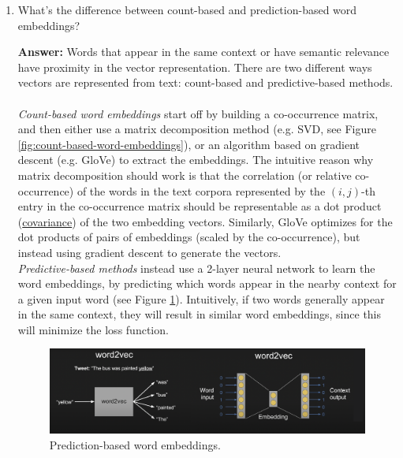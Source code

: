 \documentclass{article}
\newenvironment{QandA}{\begin{enumerate}[label=\arabic*.]}{\end{enumerate}}
\newenvironment{InnerQandA}{\begin{enumerate}[label=\roman*.]}{\end{enumerate}}
\newenvironment{answer}{\par\normalfont \textbf{Answer:}}{}
\begin{document}
\begin{QandA}
\begin{InnerQandA}
        \item What’s the difference between count-based and prediction-based word embeddings?
        \begin{answer}
            Words that appear in the same context or have semantic relevance have proximity in the vector representation. There are two different ways vectors are represented from text: count-based and predictive-based methods.\\\\
            \textit{Count-based word embeddings} start off by building a co-occurrence matrix, and then either use a matrix decomposition method (e.g. SVD, see Figure \ref{fig:count-based-word-embeddings}), or an algorithm based on gradient descent (e.g. GloVe) to extract the embeddings. The intuitive reason why matrix decomposition should work is that the correlation (or relative co-occurrence) of the words in the text corpora represented by the $(i,j)$-th entry in the co-occurrence matrix should be representable as a dot product (\href{https://www.quora.com/Is-there-any-relation-between-correlation-of-two-signals-and-dot-product-of-two-vectors}{covariance}) of the two embedding vectors. Similarly, GloVe optimizes for the dot products of pairs of embeddings (scaled by the co-occurrence), but instead using gradient descent to generate the vectors. \\
            
            
            \noindent \textit{Predictive-based methods} instead use a 2-layer neural network to learn the word embeddings, by predicting which words appear in the nearby context for a given input word (see Figure \ref{fig:prediction-based-word-embeddings}). Intuitively, if two words generally appear in the same context, they will result in similar word embeddings, since this will minimize the loss function.

            \begin{figure}[h!]
                \centering
                \includegraphics[width=0.8\columnwidth]{img/word2vec.png}
                \caption{Prediction-based word embeddings\footnotemark.}
                \label{fig:prediction-based-word-embeddings}
            \end{figure}
        \end{answer}


\end{InnerQandA}
\end{QandA}
\end{document}
